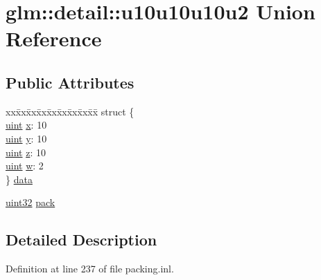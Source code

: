 \hypertarget{unionglm_1_1detail_1_1u10u10u10u2}{}\section{glm\+::detail\+::u10u10u10u2 Union Reference}
\label{unionglm_1_1detail_1_1u10u10u10u2}
\subsection*{Public Attributes}
\begin{DoxyCompactItemize}
\item 
\begin{tabbing}
xx\=xx\=xx\=xx\=xx\=xx\=xx\=xx\=xx\=\kill
struct \{\\
\>\mbox{\hyperlink{group__core__precision_ga4fd29415871152bfb5abd588334147c8}{uint}} \mbox{\hyperlink{unionglm_1_1detail_1_1u10u10u10u2_ab4237d6f4aa001d47844075c42a8e16c}{x}}: 10\\
\>\mbox{\hyperlink{group__core__precision_ga4fd29415871152bfb5abd588334147c8}{uint}} \mbox{\hyperlink{unionglm_1_1detail_1_1u10u10u10u2_a7eb44cac4892d2587f8b5f67681f8e85}{y}}: 10\\
\>\mbox{\hyperlink{group__core__precision_ga4fd29415871152bfb5abd588334147c8}{uint}} \mbox{\hyperlink{unionglm_1_1detail_1_1u10u10u10u2_a8c4c851343129c55d86d6b0b7aed9b4f}{z}}: 10\\
\>\mbox{\hyperlink{group__core__precision_ga4fd29415871152bfb5abd588334147c8}{uint}} \mbox{\hyperlink{unionglm_1_1detail_1_1u10u10u10u2_a54c0903e806192c618f70c9f437d48ec}{w}}: 2\\
\} \mbox{\hyperlink{unionglm_1_1detail_1_1u10u10u10u2_a2b1c07bb6d4d674dade5bd7c1e91c791}{data}}\\

\end{tabbing}\item 
\mbox{\hyperlink{namespaceglm_1_1detail_ade6cfbf377022aaa391af8cd50489222}{uint32}} \mbox{\hyperlink{unionglm_1_1detail_1_1u10u10u10u2_a8bb9d7804af09ba3790a4b5622321511}{pack}}
\end{DoxyCompactItemize}


\subsection{Detailed Description}


Definition at line 237 of file packing.\+inl.



